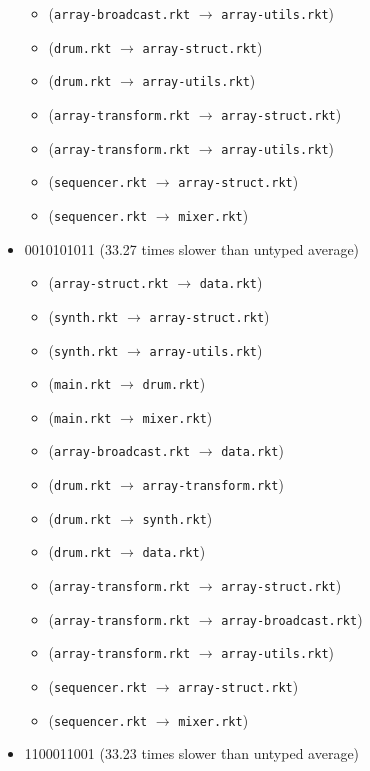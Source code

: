 \documentclass{article}
\newcommand{\mono}[1]{\texttt{#1}}
\begin{document}
\begin{itemize}
\begin{itemize}
  \item (\mono{array-broadcast.rkt} $\rightarrow$ \mono{array-utils.rkt})
  \item (\mono{drum.rkt} $\rightarrow$ \mono{array-struct.rkt})
  \item (\mono{drum.rkt} $\rightarrow$ \mono{array-utils.rkt})
  \item (\mono{array-transform.rkt} $\rightarrow$ \mono{array-struct.rkt})
  \item (\mono{array-transform.rkt} $\rightarrow$ \mono{array-utils.rkt})
  \item (\mono{sequencer.rkt} $\rightarrow$ \mono{array-struct.rkt})
  \item (\mono{sequencer.rkt} $\rightarrow$ \mono{mixer.rkt})
  \end{itemize}
\item 0010101011 (33.27 times slower than untyped average)
  \begin{itemize}
  \item (\mono{array-struct.rkt} $\rightarrow$ \mono{data.rkt})
  \item (\mono{synth.rkt} $\rightarrow$ \mono{array-struct.rkt})
  \item (\mono{synth.rkt} $\rightarrow$ \mono{array-utils.rkt})
  \item (\mono{main.rkt} $\rightarrow$ \mono{drum.rkt})
  \item (\mono{main.rkt} $\rightarrow$ \mono{mixer.rkt})
  \item (\mono{array-broadcast.rkt} $\rightarrow$ \mono{data.rkt})
  \item (\mono{drum.rkt} $\rightarrow$ \mono{array-transform.rkt})
  \item (\mono{drum.rkt} $\rightarrow$ \mono{synth.rkt})
  \item (\mono{drum.rkt} $\rightarrow$ \mono{data.rkt})
  \item (\mono{array-transform.rkt} $\rightarrow$ \mono{array-struct.rkt})
  \item (\mono{array-transform.rkt} $\rightarrow$ \mono{array-broadcast.rkt})
  \item (\mono{array-transform.rkt} $\rightarrow$ \mono{array-utils.rkt})
  \item (\mono{sequencer.rkt} $\rightarrow$ \mono{array-struct.rkt})
  \item (\mono{sequencer.rkt} $\rightarrow$ \mono{mixer.rkt})
  \end{itemize}
\item 1100011001 (33.23 times slower than untyped average)

\end{itemize}
\end{document}
